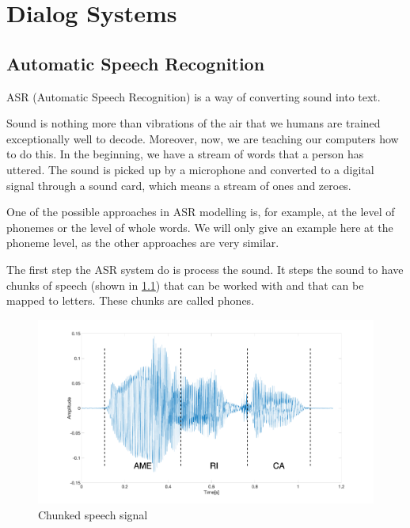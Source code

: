 \chapter{Dialog Systems} \label{chap:dialog_systems}



\section{Automatic Speech Recognition}

ASR (Automatic Speech Recognition) is a way of converting sound into text.

Sound is nothing more than vibrations of the air that we humans are trained exceptionally well to decode. Moreover, now, we are teaching our computers how to do this. In the beginning, we have a stream of words that a person has uttered. The sound is picked up by a microphone and converted to a digital signal through a sound card, which means a stream of ones and zeroes.

One of the possible approaches in ASR modelling is, for example, at the level of phonemes or the level of whole words. We will only give an example here at the phoneme level, as the other approaches are very similar.

The first step the ASR system do is process the sound. It steps the sound to have chunks of speech (shown in \cref{fig:chunked_voice}) that can be worked with and that can be mapped to letters. These chunks are called phones.

\begin{figure}[H]
    \centering
    \includegraphics[width=\textwidth]{img/voice_edit.png}
    \caption{Chunked speech signal}
    \label{fig:chunked_voice}
\end{figure}

